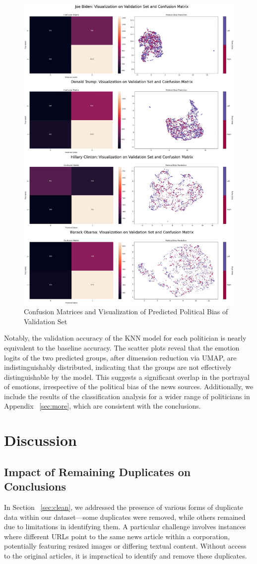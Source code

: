 \documentclass[sigconf]{acmart}
\begin{document}
\begin{figure}
    \centering
    \includegraphics[width=.5\textwidth]{assets/test_cm_bias.png}
    \caption{Confusion Matrices and Visualization of Predicted Political Bias of Validation Set}
    \label{fig:test_vis_bias}
    \vspace{10pt}
\end{figure}


Notably, the validation accuracy of the KNN model for each politician is nearly equivalent to the baseline accuracy. The scatter plots reveal that the emotion logits of the two predicted groups, after dimension reduction via UMAP, are indistinguishably distributed, indicating that the groups are not effectively distinguishable by the model. This suggests a significant overlap in the portrayal of emotions, irrespective of the political bias of the news sources. Additionally, we include the results of the classification analysis for a wider range of politicians in Appendix ~\ref{sec:more}, which are consistent with the conclusions.

\vspace{-10pt}

\section{Discussion}\label{sec:discussion}

\subsection{Impact of Remaining Duplicates on Conclusions} \label{sec:duplicates}
In Section ~\ref{sec:clean}, we addressed the presence of various forms of duplicate data within our dataset—some duplicates were removed, while others remained due to limitations in identifying them. A particular challenge involves instances where different URLs point to the same news article within a corporation, potentially featuring resized images or differing textual content. Without access to the original articles, it is impractical to identify and remove these duplicates.
\end{document}
